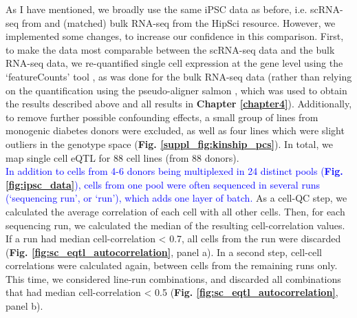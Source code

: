 As I have mentioned, we broadly use the same iPSC data as before, i.e. scRNA-seq from \cite{cuomo2020single} and (matched) bulk RNA-seq from the HipSci resource.
However, we implemented some changes, to increase our confidence in this comparison. 
First, to make the data most comparable between the scRNA-seq data and the bulk RNA-seq data, we re-quantified single cell expression at the gene level using the `featureCounts' tool \cite{liao2014featurecounts}, as was done for the bulk RNA-seq data (rather than relying on the quantification using the pseudo-aligner salmon \cite{patro2017salmon}, which was used to obtain the results described above and all results in \textbf{Chapter \ref{chapter4}}).
Additionally, to remove further possible confounding effects, a small group of lines from monogenic diabetes donors were excluded, as well as four lines which were slight outliers in the genotype space (\textbf{Fig. \ref{suppl_fig:kinship_pcs}}).
In total, we map single cell eQTL for 88 cell lines (from 88 donors). \\

\textcolor{blue}{In addition to cells from 4-6 donors being multiplexed in 24 distinct pools (\textbf{Fig. \ref{fig:ipsc_data}}), cells from one pool were often sequenced in several runs (`sequencing run', or `run'), which adds one layer of batch.}
As a cell-QC step, we calculated the average correlation of each cell with all other cells.
Then, for each sequencing run, we calculated the median of the resulting cell-correlation values.
If a run had median cell-correlation < 0.7, all cells from the run were discarded (\textbf{Fig. \ref{fig:sc_eqtl_autocorrelation}}, panel a).
In a second step, cell-cell correlations were calculated again, between cells from the remaining runs only.
This time, we considered line-run combinations, and discarded all combinations that had median cell-correlation < 0.5 (\textbf{Fig. \ref{fig:sc_eqtl_autocorrelation}}, panel b). \\

